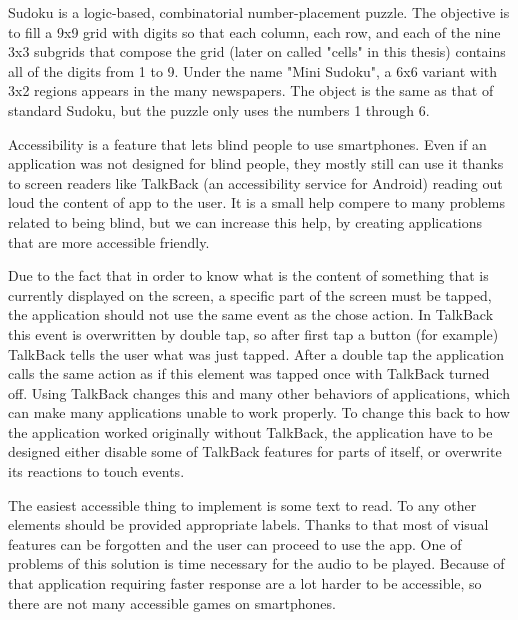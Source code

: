 \documentclass[a4paper,twoside,12pt]{book}
\begin{document}
\par Sudoku is a logic-based, combinatorial number-placement puzzle\cite{bib:sudoku}. The objective is to fill a 9x9 grid with digits so that each column, each row, and each of the nine 3x3 subgrids that compose the grid (later on called "cells" in this thesis) contains all of the digits from 1 to 9. Under the name "Mini Sudoku", a 6x6 variant with 3x2 regions appears in the many newspapers. The object is the same as that of standard Sudoku, but the puzzle only uses the numbers 1 through 6.
\par
Accessibility is a feature that lets blind people to use smartphones. Even if an application was not designed for blind people, they mostly still can use it thanks to screen readers like TalkBack (an accessibility service for Android) reading out loud the content of app to the user. It is a small help compere to many problems related to being blind, but we can increase this help, by creating applications that are more accessible friendly.
\par
Due to the fact that in order to know what is the content of something that is currently displayed on the screen, a specific part of the screen must be tapped, the application should not use the same event as the chose action. In TalkBack this event is overwritten by double tap, so after first tap a button (for example) TalkBack tells the user what was just tapped. After a double tap the application calls the same action as if this element was tapped once with TalkBack turned off. Using TalkBack changes this and many other behaviors of applications, which can make many applications unable to work properly. To change this back to how the application worked originally without TalkBack, the application have to be designed either disable some of TalkBack features for parts of itself, or overwrite its reactions to touch events.
\par
The easiest accessible thing to implement is some text to read. To any other elements should be provided appropriate labels. Thanks to that most of visual features can be forgotten and the user can proceed to use the app. One of problems of this solution is time necessary for the audio to be played. Because of that application requiring faster response are a lot harder to be accessible, so there are not many accessible games on smartphones.
\end{document}
